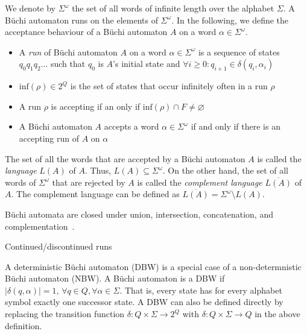 We denote by $\Sigma^\omega$ the set of all words of infinite length over the alphabet $\Sigma$. A Büchi automaton runs on the elements of $\Sigma^\omega$. In the following, we define the acceptance behaviour of a Büchi automaton $A$ on a word $\alpha \in \Sigma^\omega$.



\begin{itemize}
\item A \emph{run} of Büchi automaton $A$ on a word $\alpha \in \Sigma^\omega$ is a sequence of states $q_0q_1q_2\dots$ such that $q_0$ is $A$'s initial state and $\forall i \geq 0: q_{i+1} \in \delta(q_i, \alpha_i)$
\item $\textrm{inf}(\rho) \in 2^Q$ is the set of states that occur infinitely often in a run $\rho$
\item A run $\rho$ is accepting if an only if $\textrm{inf}(\rho) \cap F \neq \varnothing$
\item A Büchi automaton $A$ accepts a word $\alpha \in \Sigma^\omega$ if and only if there is an accepting run of $A$ on $\alpha$
\end{itemize}

The set of all the words that are accepted by a Büchi automaton $A$ is called the \emph{language} $L(A)$ of $A$. Thus, $L(A) \subseteq \Sigma^\omega$. On the other hand, the set of all words of $\Sigma^\omega$ that are rejected by $A$ is called the \emph{complement language} $\overline{L(A)}$ of $A$. The complement language can be defined as $\overline{L(A)} = \Sigma^\omega \setminus L(A)$.

Büchi automata are closed under union, intersection, concatenation, and complementation~\cite{1996_vardi}.

Continued/discontinued runs

A deterministic Büchi automaton (DBW) is a special case of a non-determnistic Büchi automaton (NBW). A Büchi automaton is a DBW if $|\delta(q,\alpha)| = 1, \, \forall q \in Q, \forall \alpha \in \Sigma $. That is, every state has for every alphabet symbol exactly one successor state. A DBW can also be defined directly by replacing the transition function $\delta: Q \times \Sigma \rightarrow 2^Q$ with $\delta: Q \times \Sigma \rightarrow Q$ in the above definition.


